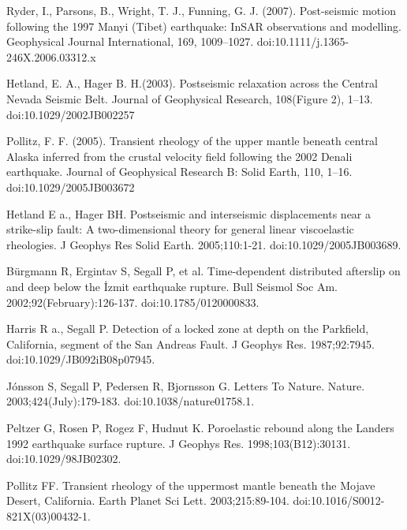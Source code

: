 \documentclass[12pt]{article}
\begin{document}
\begin{thebibliography}{}

Ryder, I., Parsons, B.,
  Wright, T. J., Funning, G. J. (2007). Post-seismic motion
  following the 1997 Manyi (Tibet) earthquake: InSAR observations and
  modelling. Geophysical Journal International, 169,
  1009–1027. doi:10.1111/j.1365-246X.2006.03312.x

Hetland, E. A.,
  Hager B. H.(2003). Postseismic relaxation across the Central Nevada
  Seismic Belt. Journal of Geophysical Research, 108(Figure 2),
  1–13. doi:10.1029/2002JB002257

Pollitz,
  F. F. (2005). Transient rheology of the upper mantle beneath central
  Alaska inferred from the crustal velocity field following the 2002
  Denali earthquake. Journal of Geophysical Research B: Solid Earth,
  110, 1–16. doi:10.1029/2005JB003672

 Hetland E a., Hager
  BH. Postseismic and interseismic displacements near a strike-slip
  fault: A two-dimensional theory for general linear viscoelastic
  rheologies. J Geophys Res Solid
  Earth. 2005;110:1-21. doi:10.1029/2005JB003689.

 B\"{u}rgmann R,
  Ergintav S, Segall P, et al. Time-dependent distributed afterslip on
  and deep below the İzmit earthquake rupture. Bull Seismol Soc
  Am. 2002;92(February):126-137. doi:10.1785/0120000833.

 Harris R a., Segall
  P. Detection of a locked zone at depth on the Parkfield, California,
  segment of the San Andreas Fault. J Geophys
  Res. 1987;92:7945. doi:10.1029/JB092iB08p07945.

 J\'onsson S, Segall P, Pedersen
  R, Bjornsson G. Letters To
  Nature. Nature. 2003;424(July):179-183. doi:10.1038/nature01758.1.

 Peltzer G, Rosen P,
  Rogez F, Hudnut K. Poroelastic rebound along the Landers 1992
  earthquake surface rupture. J Geophys
  Res. 1998;103(B12):30131. doi:10.1029/98JB02302.

 Pollitz FF. Transient rheology
  of the uppermost mantle beneath the Mojave Desert, California. Earth
  Planet Sci Lett. 2003;215:89-104. doi:10.1016/S0012-821X(03)00432-1.


\end{thebibliography}
\end{document}
